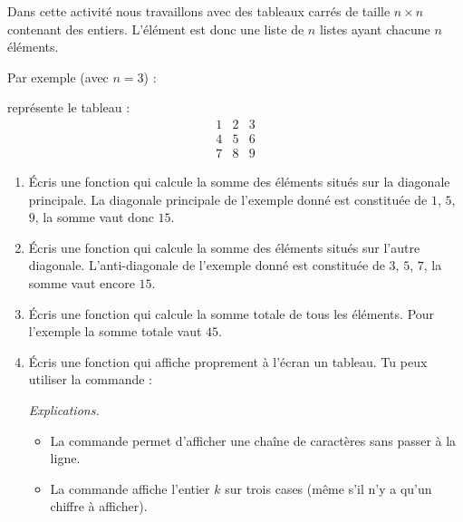 \documentclass[11pt,class=report,crop=false]{standalone}
\begin{document}

\begin{activite}[Tableau]


Dans cette activité nous travaillons avec des tableaux carrés de taille $n \times n$ contenant des entiers.
L'élément  est donc une liste de $n$ listes ayant chacune $n$ éléments.

Par exemple (avec $n=3$) : \\
\centerline{}
représente le tableau :
$$\begin{array}{ccc}1&2&3\\4&5&6\\7&8&9\end{array}$$

\begin{enumerate}
  \item Écris une fonction  qui calcule la somme des éléments situés sur la diagonale principale.
  La diagonale principale de l'exemple donné est constituée de $1$, $5$, $9$, la somme vaut donc $15$.
  
  \item Écris une fonction  qui calcule la somme des éléments situés sur l'autre diagonale.
  L'anti-diagonale de l'exemple donné est constituée de $3$, $5$, $7$, la somme vaut encore $15$.
  
  \item Écris une fonction  qui calcule la somme totale de tous les éléments. Pour l'exemple la somme totale vaut $45$.
  
  \item  Écris une fonction  qui affiche proprement à l'écran un tableau. Tu peux utiliser la commande :\\
\centerline{}  

\emph{Explications.}
\begin{itemize}
  \item La commande  permet d'afficher une chaîne de caractères sans passer à la ligne.
  
  \item La commande  affiche l'entier $k$ sur trois cases (même s'il n'y a qu'un chiffre à afficher).
\end{itemize}  
\end{enumerate}

\end{activite}
\end{document}
